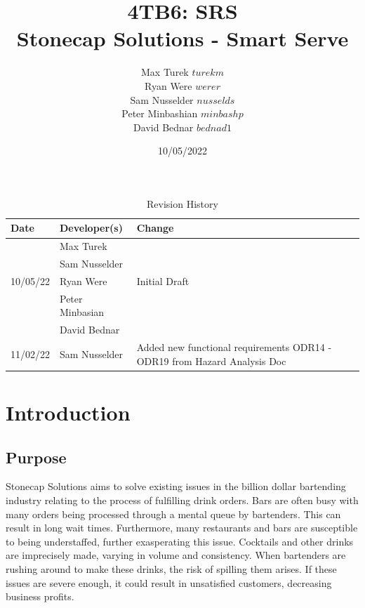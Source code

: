 \documentclass{article}
\title{\textbf{4TB6: SRS}\\
\addlinespace
\addlinespace
\addlinespace
\addlinespace
\large \textbf{Stonecap Solutions - Smart Serve}
\addlinespace
\addlinespace
\addlinespace
\addlinespace}
\author{Max Turek $turekm$\\Ryan Were $werer$\\Sam Nusselder $nusselds$\\Peter Minbashian $minbashp$\\David Bednar $bednad1$}
\date{10/05/2022}
\begin{document}
\maketitle
\newpage
\tableofcontents

\newpage

    \begin{table}[hp]
    \caption{Revision History} \label{TblRevisionHistory}
    \hline
        \begin{tabularx}{\textwidth}{llX}
        \toprule
        \textbf{Date} & \textbf{Developer(s)} & \textbf{Change}\\
        \midrule
        & Max Turek & \\
        & Sam Nusselder &  \\
        10/05/22 & Ryan Were & Initial Draft\\
        & Peter Minbasian & \\
        & David Bednar & \\
        \bottomrule
        \hline
        \toprule
        \midrule
        11/02/22 & Sam Nusselder & Added new functional requirements ODR14 - ODR19 from Hazard Analysis Doc\\
        \bottomrule
        \hline
        \end{tabularx}
    \end{table}

\newpage
\section{Introduction}
\subsection{Purpose} %
    Stonecap Solutions aims to solve existing issues in the billion dollar bartending industry relating to the process of fulfilling drink orders. Bars are often busy with many orders being processed through a mental queue by bartenders. This can result in long wait times. Furthermore, many restaurants and bars are susceptible to being understaffed, further exasperating this issue. Cocktails and other drinks are imprecisely made, varying in volume and consistency. When bartenders are rushing around to make these drinks, the risk of spilling them arises. If these issues are severe enough, it could result in unsatisfied customers, decreasing business profits. \\
\end{document}
